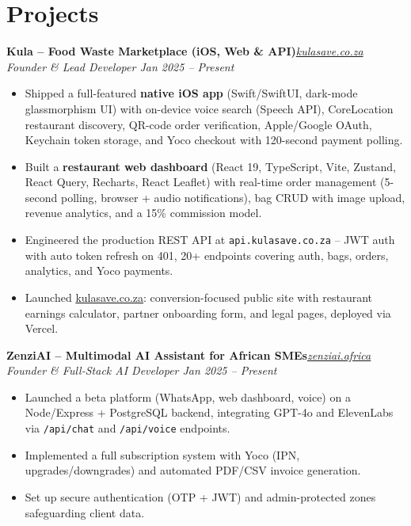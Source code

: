\documentclass[a4paper,9.5pt]{extarticle}
\newcommand{\entry}[3]{%
  \noindent\begin{minipage}{\linewidth}%
    \textbf{#1}\hfill\textit{\small #2}\\[-1pt]%
    \textit{\small #3}%
  \end{minipage}\vspace{1pt}%
}
\begin{document}
\section{Projects}

\entry{Kula -- Food Waste Marketplace (iOS, Web \& API)}{\href{https://www.kulasave.co.za}{kulasave.co.za}}{Founder \& Lead Developer \hfill Jan 2025 -- Present}
\begin{itemize}[nosep]
\item Shipped a full-featured \textbf{native iOS app} (Swift/SwiftUI, dark-mode glassmorphism UI) with on-device voice search (Speech API), CoreLocation restaurant discovery, QR-code order verification, Apple/Google OAuth, Keychain token storage, and Yoco checkout with 120-second payment polling.
\item Built a \textbf{restaurant web dashboard} (React 19, TypeScript, Vite, Zustand, React Query, Recharts, React Leaflet) with real-time order management (5-second polling, browser + audio notifications), bag CRUD with image upload, revenue analytics, and a 15\% commission model.
\item Engineered the production REST API at \texttt{api.kulasave.co.za} -- JWT auth with auto token refresh on 401, 20+ endpoints covering auth, bags, orders, analytics, and Yoco payments.
\item Launched \href{https://www.kulasave.co.za}{kulasave.co.za}: conversion-focused public site with restaurant earnings calculator, partner onboarding form, and legal pages, deployed via Vercel.
\end{itemize}

\vspace{2pt}
\entry{ZenziAI -- Multimodal AI Assistant for African SMEs}{\href{https://zenziai.africa}{zenziai.africa}}{Founder \& Full-Stack AI Developer \hfill Jan 2025 -- Present}
\begin{itemize}[nosep]
\item Launched a beta platform (WhatsApp, web dashboard, voice) on a Node/Express + PostgreSQL backend, integrating GPT-4o and ElevenLabs via \texttt{/api/chat} and \texttt{/api/voice} endpoints.
\item Implemented a full subscription system with Yoco (IPN, upgrades/downgrades) and automated PDF/CSV invoice generation.
\item Set up secure authentication (OTP + JWT) and admin-protected zones safeguarding client data.
\end{itemize}
\end{document}
